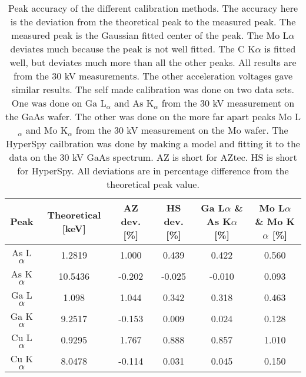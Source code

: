 
\begin{table}[ht]
    \centering
    \caption{
        Peak accuracy of the different calibration methods.
        The accuracy here is the deviation from the theoretical peak to the measured peak.
        The measured peak is the Gaussian fitted center of the peak.
        The Mo L$\alpha$ deviates much because the peak is not well fitted.
        The C K$\alpha$ is fitted well, but deviates much more than all the other peaks.
        All results are from the 30 kV measurements.
        The other acceleration voltages gave similar results.
        The self made calibration was done on two data sets.
        One was done on Ga L$_\alpha$ and As K$_\alpha$ from the 30 kV measurement on the GaAs wafer.
        The other was done on the more far apart peaks Mo L$_\alpha$ and Mo K$_\alpha$ from the 30 kV measurement on the Mo wafer.
        The HyperSpy cailbration was done by making a model and fitting it to the data on the 30 kV GaAs spectrum.
        AZ is short for AZtec.
        HS is short for HyperSpy.
        All deviations are in percentage difference from the theoretical peak value.
    }
    \label{tab:results:calibration-peak-accuracy}
    \begin{tabular}{cccccc}
        Peak         & Theoretical [keV] & AZ dev. [\%] & HS dev. [\%] & Ga L{$\alpha$} \& As K{$\alpha$} [\%] & Mo L{$\alpha$} \& Mo K{$\alpha$} [\%] \\
        \hline
        As L$\alpha$ & 1.2819            & 1.000        & 0.439        & 0.422                                 & 0.560                                 \\
        As K$\alpha$ & 10.5436           & -0.202       & -0.025       & -0.010                                & 0.093                                 \\
        Ga L$\alpha$ & 1.098             & 1.044        & 0.342        & 0.318                                 & 0.463                                 \\
        Ga K$\alpha$ & 9.2517            & -0.153       & 0.009        & 0.024                                 & 0.128                                 \\
        Cu L$\alpha$ & 0.9295            & 1.767        & 0.888        & 0.857                                 & 1.010                                 \\
        Cu K$\alpha$ & 8.0478            & -0.114       & 0.031        & 0.045                                 & 0.150                                 \\

\end{tabular}
\end{table}
